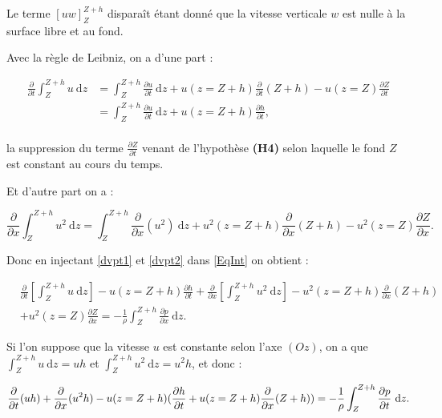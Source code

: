 \documentclass[
11pt, %
francais, %
singlespacing, %
headsepline, %
]{MastersDoctoralThesis} %
\theoremstyle{definition}
\begin{document}
Le terme $\left[uw\right]_{Z}^{Z+h}$ disparaît étant donné que la vitesse verticale $w$ est nulle à la surface libre et au fond.

Avec la règle de Leibniz, on a d'une part :

\begin{equation}
\begin{split}
 \frac{\partial}{\partial t}\int_{Z}^{Z+h}u ~\mathrm dz & = \int_{Z}^{Z+h}\frac{\partial u}{\partial t} ~\mathrm dz +u(z=Z+h)\frac{\partial}{\partial t}(Z+h)-u(z=Z)\frac{\partial Z}{\partial t} \\
& = \int_{Z}^{Z+h}\frac{\partial u}{\partial t} ~\mathrm dz +u(z=Z+h)\frac{\partial h}{\partial t} ,\label{dvpt1}\\
\end{split}
\end{equation}

la suppression du terme $\frac{\partial Z}{\partial t}$ venant de l'hypothèse \textbf{(H4)} selon laquelle le fond $Z$ est constant au cours du temps.

Et d'autre part on a :

\begin{equation}
\frac{\partial}{\partial x}\int_{Z}^{Z+h}u^{2} ~\mathrm dz = \int_{Z}^{Z+h}\frac{\partial }{\partial x}(u^{2}) ~\mathrm dz +u^{2}(z=Z+h)\frac{\partial}{\partial x}(Z+h)-u^{2}(z=Z)\frac{\partial Z}{\partial x}. \label{dvpt2}
\end{equation}

Donc en injectant \eqref{dvpt1} et \eqref{dvpt2} dans \eqref{EqInt} on obtient :

\begin{equation}
\begin{split}
& \frac{\partial}{\partial t}\left[\int_{Z}^{Z+h}u ~\mathrm dz\right] -u(z=Z+h)\frac{\partial h}{\partial t} + \frac{\partial}{\partial x}\left[\int_{Z}^{Z+h} u^{2} ~\mathrm dz\right]-u^{2}(z=Z+h)\frac{\partial}{\partial x}(Z+h) \\
& +u^{2}(z=Z)\frac{\partial Z}{\partial x}= -\frac{1}{\rho}\int_{Z}^{Z+h}\frac{\partial p}{\partial x} ~\mathrm dz.
\end{split}
\end{equation}


Si l'on suppose que la vitesse $u$ est constante selon l'axe $(Oz)$, on a que $\int_{Z}^{Z+h}u ~\mathrm dz = uh$ et $\int_{Z}^{Z+h}u^{2} ~\mathrm dz = u^{2}h$, et donc :

\begin{equation}
 \frac{\partial}{\partial t}(uh)+ \frac{\partial}{\partial x}(u^{2}h)-u(z=Z+h)(\frac{\partial h}{\partial t}+u(z=Z+h)\frac{\partial}{\partial x}(Z+h)) \\
 =-\frac{1}{\rho}\int_{Z}^{Z+h}\frac{\partial p}{\partial t} ~\mathrm dz. \label{name}
\end{equation}
\end{document}
